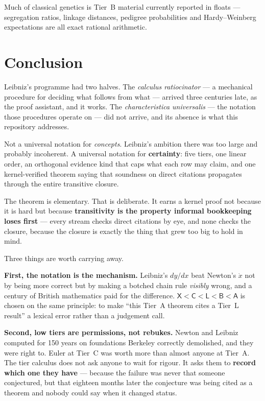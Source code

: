 \documentclass[11pt,a4paper]{article}
\newcommand{\tierorder}{\ensuremath{\mathsf{X} < \mathsf{C} < \mathsf{L} < \mathsf{B} < \mathsf{A}}}
\begin{document}
Much of classical genetics is Tier~B material currently reported in floats — segregation ratios,
linkage distances, pedigree probabilities and Hardy–Weinberg expectations are all exact rational
arithmetic.

\section{Conclusion}

Leibniz's programme had two halves. The \emph{calculus ratiocinator} — a mechanical procedure for
deciding what follows from what — arrived three centuries late, as the proof assistant, and it
works. The \emph{characteristica universalis} — the notation those procedures operate on — did
not arrive, and its absence is what this repository addresses.

Not a universal notation for \emph{concepts}. Leibniz's ambition there was too large and probably
incoherent. A universal notation for \textbf{certainty}: five tiers, one linear order, an
orthogonal evidence kind that caps what each row may claim, and one kernel-verified theorem
saying that soundness on direct citations propagates through the entire transitive closure.

The theorem is elementary. That is deliberate. It earns a kernel proof not because it is hard but
because \textbf{transitivity is the property informal bookkeeping loses first} — every stream
checks direct citations by eye, and none checks the closure, because the closure is exactly the
thing that grew too big to hold in mind.

Three things are worth carrying away.

\textbf{First, the notation is the mechanism.} Leibniz's $dy/dx$ beat Newton's $\dot{x}$ not by
being more correct but by making a botched chain rule \emph{visibly} wrong, and a century of
British mathematics paid for the difference. \tierorder{} is chosen on the same principle: to
make ``this Tier~A theorem cites a Tier~L result'' a lexical error rather than a judgement call.

\textbf{Second, low tiers are permissions, not rebukes.} Newton and Leibniz computed for 150 years
on foundations Berkeley correctly demolished, and they were right to. Euler at Tier~C was worth
more than almost anyone at Tier~A. The tier calculus does not ask anyone to wait for rigour. It
asks them to \textbf{record which one they have} — because the failure was never that someone
conjectured, but that eighteen months later the conjecture was being cited as a theorem and
nobody could say when it changed status.
\end{document}
